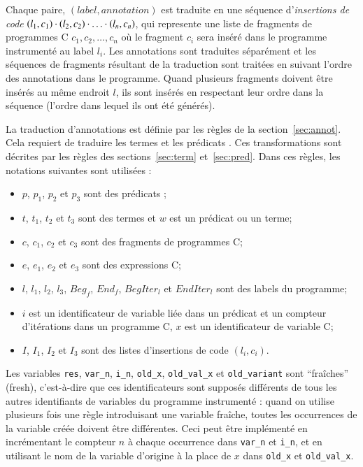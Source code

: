 Chaque paire, $(label, annotation)$ est traduite en une séquence
d'\emph{insertions de code}
$(l_1, c_1) \cdot (l_2, c_2) \cdot \ldots \cdot (l_n, c_n)$, qui 
represente une liste de fragments de programmes C $c_1, c_2, \ldots, c_n$ où
le fragment $c_i$ sera inséré dans le programme instrumenté au label $l_i$.
Les annotations \eacsl sont traduites séparément et les séquences de fragments
résultant de la traduction sont traitées en suivant l'ordre des annotations dans
le programme.
Quand plusieurs fragments doivent être insérés au même endroit $l$, ils sont
insérés en respectant leur ordre dans la séquence (l'ordre dans lequel ils ont
été générés).

La traduction d'annotations est définie par les règles de la
section~\ref{sec:annot}.
Cela requiert de traduire les termes et les prédicats \eacsl.
Ces transformations sont décrites par les règles des sections~\ref{sec:term}
et~\ref{sec:pred}.
Dans ces règles, les notations suivantes sont utilisées :
\begin{itemize}
\item $p$, $p_1$, $p_2$ et $p_3$ sont des prédicats \eacsl;
\item $t$, $t_1$, $t_2$ et $t_3$ sont des termes \eacsl et $w$ est un prédicat
  ou un terme;
\item $c$, $c_1$, $c_2$ et $c_3$ sont des fragments de programmes C;
\item $e$, $e_1$, $e_2$ et $e_3$ sont des expressions C;
\item $l$, $l_1$, $l_2$, $l_3$, $Beg_f$, $End_f$, $BegIter_l$ et $EndIter_l$ sont
  des labels du programme;
\item $i$ est un identificateur de variable liée dans un prédicat \eacsl et un
  compteur d'itérations dans un programme C, $x$ est un identificateur de
  variable C;
\item $I$, $I_1$, $I_2$ et $I_3$ sont des listes d'insertions de code
  $(l_i, c_i)$.
\end{itemize}

Les variables \lstinline'res', \lstinline'var_n', \lstinline'i_n',
\lstinline|old_x|, \lstinline'old_val_x' et \lstinline|old_variant| sont
``fraîches'' (fresh), c'est-à-dire que ces identificateurs sont supposés
différents de tous les autres identifiants de variables du programme instrumenté
: quand on utilise plusieurs fois une règle introduisant une variable fraîche,
toutes les occurrences de la variable créée doivent être différentes.
Ceci peut être implémenté en incrémentant le compteur $n$ à chaque occurrence
dans \lstinline'var_n' et \lstinline'i_n', et en utilisant le nom de la variable
d'origine à la place de $x$ dans \lstinline'old_x' et \lstinline'old_val_x'.

